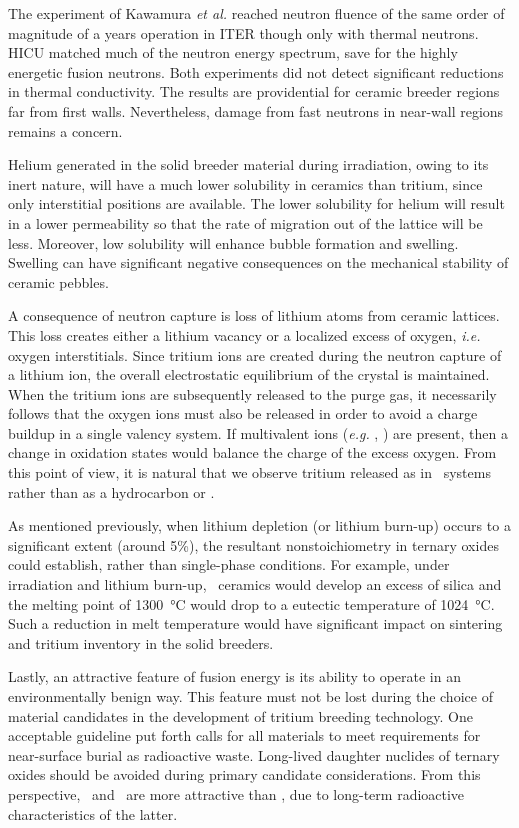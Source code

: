 \documentclass[11pt]{report} %
\newcommand{\lit}{\ce{Li2TiO3}}
\newcommand{\lis}{\ce{Li4SiO4}}
\newcommand{\lio}{\ce{Li2O}}
\newcommand{\liz}{\ce{Li2ZrO3}}
\begin{document}
The experiment of Kawamura \textit{et al.} reached neutron fluence of the same order of magnitude of a years operation in ITER though only with thermal neutrons. HICU matched much of the neutron energy spectrum, save for the highly energetic fusion neutrons. Both experiments did not detect significant reductions in thermal conductivity. The results are providential for ceramic breeder regions far from first walls. Nevertheless, damage from fast neutrons in near-wall regions remains a concern.

Helium generated in the solid breeder material during irradiation, owing to its inert nature, will have a much lower solubility in ceramics than tritium, since only interstitial positions are available. The lower solubility for helium will result in a lower permeability so that the rate of migration out of the lattice will be less. Moreover, low solubility will enhance bubble formation and swelling. Swelling can have significant negative consequences on the mechanical stability of ceramic pebbles.

A consequence of neutron capture is loss of lithium atoms from ceramic lattices. This loss creates either a lithium vacancy or a localized excess of oxygen, \textit{i.e.} oxygen interstitials. Since tritium ions are created during the neutron capture of a lithium ion, the overall electrostatic equilibrium of the crystal is maintained. When the tritium ions are subsequently released to the purge gas, it necessarily follows that the oxygen ions must also be released in order to avoid a charge buildup in a single valency system. If multivalent ions (\textit{e.g.} , ) are present, then a change in oxidation states would balance the charge of the excess oxygen. From this point of view, it is natural that we observe tritium released as  in \lio~systems rather than as a hydrocarbon or .\cite{Johnson1981}

As mentioned previously, when lithium depletion (or lithium burn-up) occurs to a significant extent (around 5\%), the resultant nonstoichiometry in ternary oxides could establish, rather than single-phase conditions. For example, under irradiation and lithium burn-up, \lis~ceramics would develop an excess of silica and the melting point of \SI{1300}{\celsius} would drop to a eutectic temperature of \SI{1024}{\celsius}. Such a reduction in melt temperature would have significant impact on sintering and tritium inventory in the solid breeders.\cite{Johnson1981}

Lastly, an attractive feature of fusion energy is its ability to operate in an environmentally benign way. This feature must not be lost during the choice of material candidates in the development of tritium breeding technology. One acceptable guideline put forth calls for all materials to meet requirements for near-surface burial as radioactive waste.\cite{Roux199831} Long-lived daughter nuclides of ternary oxides should be avoided during primary candidate considerations. From this perspective, \lit~and \lis~are more attractive than \liz, due to long-term radioactive characteristics of the latter.
\end{document}
